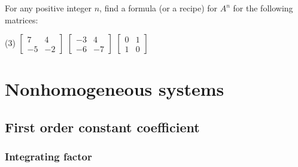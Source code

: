 \begin{exercise}
For any positive integer $n$,
find a formula (or a recipe) for $A^n$ for the following matrices:
\begin{tasks}(3)
\task
$\begin{bmatrix}
7 & 4 \\ -5 & -2
\end{bmatrix}$
\task
$\begin{bmatrix}
-3 & 4 \\ -6 & -7
\end{bmatrix}$
\task
$\begin{bmatrix}
0 & 1 \\ 1 & 0
\end{bmatrix}$
\end{tasks}
\end{exercise}


\sectionnewpage
\section{Nonhomogeneous systems}
\label{nonhomogsys:section}


\subsection{First order constant coefficient}

\subsubsection{Integrating factor}

